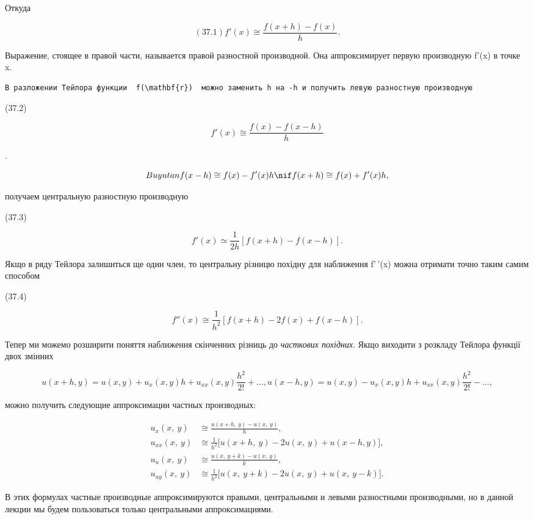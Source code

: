 \documentclass[
  ukrainian,
]{article}
\begin{document}
Откуда

\[
(37.1) f'(x) \cong \frac{f(x+h)-f(x)}{h}.
\]

Выражение, стоящее в правой части, называется правой разностной
производной. Она аппроксимирует первую производную f'(x) в точке x.

\begin{verbatim}
В разложении Тейлора функции  f(\mathbf{r})  можно заменить h на -h и получить левую разностную производную
\end{verbatim}

(37.2)

\[
f'(x) \cong \frac{f(x) - f(x - h)}{h}
\]

.

\[
Buyutan  f(x - h) \cong f(x) - f'(x) h  \nif  f(x + h) \cong f( x) + f'(x) h  ,
\]

получаем центральную разностную производную

(37.3)

\[
f'(x) \simeq \frac{1}{2h} [f(x+h) - f(x-h)].
\]

Якщо в ряду Тейлора залишиться ще один член, то центральну різницю
похідну для наближення f'\,'(x) можна отримати точно таким самим
способом

(37.4)

\[
f''(x) \cong \frac{1}{h^2} [f(x+h) - 2f(x) + f(x-h)].
\]

Тепер ми можемо розширити поняття наближення скінченних різниць до
\emph{часткових похідних}. Якщо виходити з розкладу Тейлора функції двох
змінних

\[
u(x+h, y) = u(x, y) + u_x(x, y)h + u_{xx}(x, y)\frac{h^2}{2!} + \dots,
u(x-h, y) = u(x, y) - u_x(x, y)h + u_{xx}(x, y)\frac{h^2}{2!} - \dots,
\]

можно получить следующие аппроксимации частных производных:

\[
\begin{split} u_x(x,\ y) & \cong \frac{u(x+h,\ y)-u(x,\ y)}{h}, \\ u_{xx}(x,\ y) & \cong \frac{1}{h^2} \big[ u(x+h,\ y)-2u(x,\ y)+u(x-h,y) \big], \\ u_u(x,\ y) & \cong \frac{u(x,\ y+k)-u(x,\ y)}{k}, \\ u_{uy}(x,\ y) & \cong \frac{1}{h^2} \big[ u(x,\ y+k)-2u(x,\ y)+u(x,\ y-k) \big]. \end{split}
\]

В этих формулах частные производные аппроксимируются правыми,
центральными и левыми разностными производными, но в данной лекции мы
будем пользоваться только центральными аппроксимациями.
\end{document}
